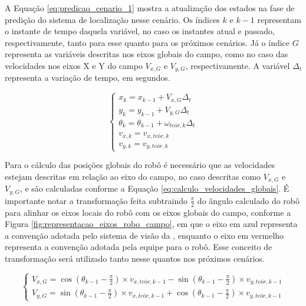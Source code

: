 \documentclass[acronym, symbols, table, deposito]{fei}
\begin{document}
				A Equação \eqref{eq:predicao_cenario_1} mostra a atualização dos estados na fase de predição do sistema de localização nesse cenário. Os índices $k$ e $k-1$ representam o instante de tempo daquela variável, no caso os instantes atual e passado, respectivamente, tanto para esse quanto para os próximos cenários. Já o índice $G$ representa as variáveis descritas nos eixos globais do campo, como no caso das velocidades nos eixos X e Y do campo $V_{x,G}$ e $V_{y,G}$, respectivamente. A variável $\Delta_t$ representa a variação de tempo, em segundos.
				
				\begin{equation}\label{eq:predicao_cenario_1}
					\begin{cases}
						x_{k} = x_{k-1} + V_{x,G} \Delta_t \\
						y_{k} = y_{k-1} + V_{y,G} \Delta_t  \\
						\theta_{k} = \theta_{k-1} + \omega_{teór,k} \Delta_t \\
						v_{x,k} = v_{x,teór,k}\\
						v_{y,k} = v_{y,teór,k}
					\end{cases}
				\end{equation}
			
			Para o cálculo das posições globais do robô é necessário que as velocidades estejam descritas em relação ao eixo do campo, no caso descritas como $V_{x,G}$ e $V_{y,G}$, e são calculadas conforme a Equação \eqref{eq:calculo_velocidades_globais}. É importante notar a transformação feita subtraindo $\frac{\pi}{2}$ do ângulo calculado do robô para alinhar os eixos locais do robô com os eixos globais do campo, conforme a Figura \ref{fig:representacao_eixos_robo_campo}, em que o eixo em azul representa a convenção adotada pelo sistema de visão da , enquanto o eixo em vermelho representa a convenção adotada pela equipe para o robô. Esse conceito de transformação será utilizado tanto nesse quantos nos próximos cenários.
			
				\begin{equation}\label{eq:calculo_velocidades_globais}
					\begin{cases}
						V_{x,G} = \cos(\theta_{k-1} - \frac{\pi}{2}) \times v_{x,teór,k-1} - \sin(\theta_{k-1} - \frac{\pi}{2}) \times v_{y,teór,k-1} \\
						V_{y,G} = \sin(\theta_{k-1} - \frac{\pi}{2}) \times v_{x,teór,k-1} + \cos(\theta_{k-1} - \frac{\pi}{2}) \times v_{y,teór,k-1}
					\end{cases}
				\end{equation}
			
\end{document}
